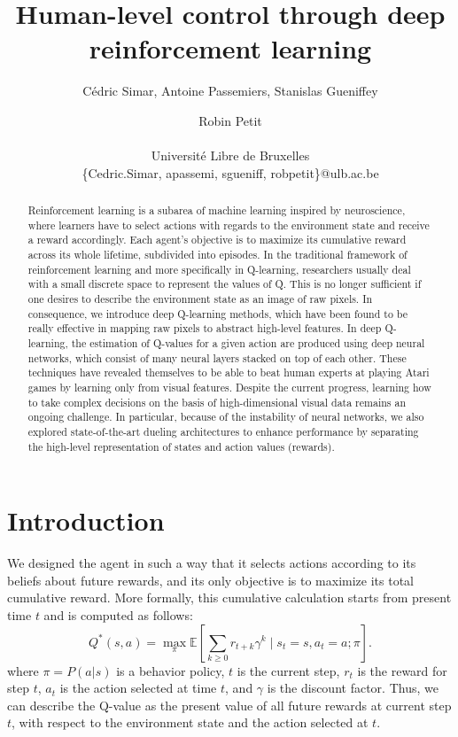 \documentclass[letterpaper]{article}
\title{Human-level control through deep reinforcement learning}
\author{C\'{e}dric Simar, Antoine Passemiers, Stanislas Gueniffey \and Robin Petit \\
\mbox{}\\
Universit\'{e} Libre de Bruxelles \\
\{Cedric.Simar, apassemi, sgueniff, robpetit\}@ulb.ac.be}
\newcommand{\E}{\mathbb E}
\begin{document}
\maketitle

\begin{abstract}

  Reinforcement learning is a subarea of machine learning inspired by neuroscience, where learners have to select actions with
  regards to the environment state and receive a reward accordingly. Each agent's objective is to maximize its cumulative reward across its whole lifetime,
  subdivided into episodes. In the traditional framework of reinforcement learning and more specifically in Q-learning,
  researchers usually deal with a small discrete space to represent the values of Q. This is no longer sufficient if one desires to describe the environment state
  as an image of raw pixels. In consequence, we introduce deep Q-learning methods, which have been found to be really effective in mapping raw pixels
  to abstract high-level features. In deep Q-learning, the estimation of Q-values for a given action are produced using deep neural networks,
  which consist of many neural layers stacked on top of each other.
  These techniques have revealed themselves to be able to beat human experts at playing Atari games
  by learning only from visual features. Despite the current progress, learning how to take complex decisions on the basis of high-dimensional visual data remains an
  ongoing challenge. In particular, because of the instability of neural networks, we also explored state-of-the-art dueling architectures to enhance performance
  by separating the high-level representation of states and action values (rewards).

\end{abstract}

\section{Introduction}

We designed the agent in such a way that it selects actions according to its beliefs about future rewards, and its only objective is to maximize its total
cumulative reward. More formally, this cumulative calculation starts from present time $t$ and is computed as follows:
\begin{equation}
  Q^{*}(s, a) = \max_{\pi} \E\left[ \sum_{k \geq 0}r_{t+k}\gamma^k \; \big| \; s_t = s, a_t = a; \pi\right].
\end{equation}
where $\pi = P(a | s)$ is a behavior policy, $t$ is the current step, $r_t$ is the reward for step $t$, $a_t$ is the action selected at time $t$,
and $\gamma$ is the discount factor. Thus, we can describe the Q-value as the present value of all future rewards at current step $t$,
with respect to the environment state and the action selected at $t$.
\end{document}
